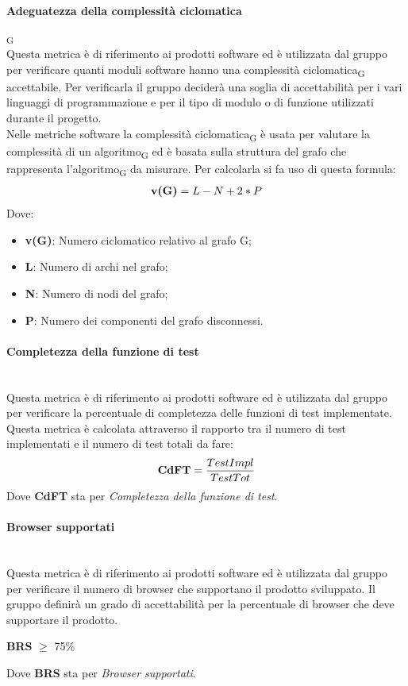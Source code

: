 \paragraph{Adeguatezza della complessità ciclomatica}\textsubscript{G}\mbox{}\\
Questa metrica è di riferimento ai prodotti software ed è utilizzata dal gruppo per verificare quanti moduli software hanno una complessità ciclomatica\textsubscript{G} accettabile. Per verificarla il gruppo deciderà una soglia di accettabilità per i vari linguaggi di programmazione e per il tipo di modulo o di funzione utilizzati durante il progetto.\\
Nelle metriche software la complessità ciclomatica\textsubscript{G} è usata per valutare la complessità di un algoritmo\textsubscript{G} ed è basata sulla struttura del grafo che rappresenta l’algoritmo\textsubscript{G} da misurare. Per calcolarla si fa uso di questa formula:
\begin{align*}
	\centering
	\textbf{v(G)} = L - N + 2 * P
\end{align*}
Dove:
\begin{itemize}
	\item \textbf{v(G)}: Numero ciclomatico relativo al grafo G;
	\item \textbf{L}: Numero di archi nel grafo;
	\item \textbf{N}: Numero di nodi del grafo;
	\item \textbf{P}: Numero dei componenti del grafo disconnessi.
\end{itemize}
\paragraph{Completezza della funzione di test}\mbox{}\\
Questa metrica è di riferimento ai prodotti software ed è utilizzata dal gruppo per verificare la percentuale di completezza delle funzioni di test implementate. Questa metrica è calcolata attraverso il rapporto tra il numero di test implementati e il numero di test totali da fare:
\begin{align*}
	\centering
	\textbf{CdFT} = \frac{TestImpl}{TestTot}
\end{align*}
Dove \textbf{CdFT} sta per \textit{Completezza della funzione di test}.
\paragraph{Browser supportati}\mbox{}\\
Questa metrica è di riferimento ai prodotti software ed è utilizzata dal gruppo per verificare il numero di browser che supportano il prodotto sviluppato. Il gruppo definirà un grado di accettabilità per la percentuale di browser che deve supportare il prodotto.
\begin{center}
	\textbf{BRS} $\geq$ 75\%
\end{center}
Dove \textbf{BRS} sta per \textit{Browser supportati}.

